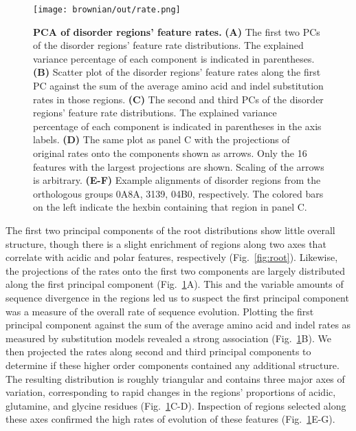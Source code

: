 \begin{figure}[h!]
\texttt{[image: brownian/out/rate.png]}
\centering
\caption{\textbf{PCA of disorder regions' feature rates.}
\textbf{(A)} The first two PCs of the disorder regions' feature rate distributions. The explained variance percentage of each component is indicated in parentheses. \textbf{(B)} Scatter plot of the disorder regions' feature rates along the first PC against the sum of the average amino acid and indel substitution rates in those regions. \textbf{(C)} The second and third PCs of the disorder regions' feature rate distributions. The explained variance percentage of each component is indicated in parentheses in the axis labels. \textbf{(D)} The same plot as panel C with the projections of original rates onto the components shown as arrows. Only the 16 features with the largest projections are shown. Scaling of the arrows is arbitrary. \textbf{(E-F)} Example alignments of disorder regions from the orthologous groups 0A8A, 3139, 04B0, respectively. The colored bars on the left indicate the hexbin containing that region in panel C.}
\label{fig:rate}
\end{figure}

The first two principal components of the root distributions show little overall structure, though there is a slight enrichment of regions along two axes that correlate with acidic and polar features, respectively (Fig.~\ref{fig:root}). Likewise, the projections of the rates onto the first two components are largely distributed along the first principal component (Fig.~\ref{fig:rate}A). This and the variable amounts of sequence divergence in the regions led us to suspect the first principal component was a measure of the overall rate of sequence evolution. Plotting the first principal component against the sum of the average amino acid and indel rates as measured by substitution models revealed a strong association (Fig.~\ref{fig:rate}B). We then projected the rates along second and third principal components to determine if these higher order components contained any additional structure. The resulting distribution is roughly triangular and contains three major axes of variation, corresponding to rapid changes in the regions' proportions of acidic, glutamine, and glycine residues (Fig.~\ref{fig:rate}C-D). Inspection of regions selected along these axes confirmed the high rates of evolution of these features (Fig.~\ref{fig:rate}E-G).

